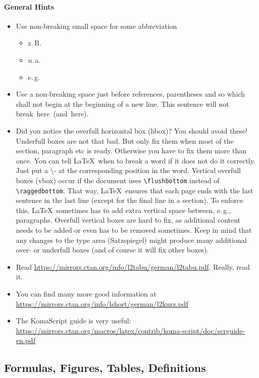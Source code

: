 \paragraph{General Hints}
\begin{itemize}
 \item Use non-breaking small space for some abbreviation
 \begin{itemize}
 \item z.\,B.
 \item u.\,a.
 \item e.\,g.
 \end{itemize}
 \item Use a non-breaking space just before references, parentheses and so which shall not begin at the beginning of a new line. This sentence will not break~here~(and~here).
 \item Did you notice the overfull horizontal box (hbox)? You should avoid these! Underfull boxes are not that bad. But only fix them when most of the section, paragraph etc is ready. Otherwise you have to fix them more than once. You can tell \LaTeX\ when to break a word if it does not do it correctly. Just put a \textbackslash- at the corresponding position in the word. Vertical overfull boxes (vbox) occur if the document uses \verb|\flushbottom| instead of \verb|\raggedbottom|. That way, \LaTeX\ ensures that each page ends with the last sentence in the last line (except for the final line in a section). To enforce this, \LaTeX\ sometimes has to add extra vertical space between, e.\,g., paragraphs. Overfull vertical boxes are hard to fix, as additional content needs to be added or even has to be removed sometimes. Keep in mind that any changes to the type area (Satzspiegel) might produce many additional over- or underfull boxes (and of course it will fix other boxes).
 \item Read \url{https://mirrors.ctan.org/info/l2tabu/german/l2tabu.pdf}. Really, read it.
 \item You can find many more good information at \url{https://mirrors.ctan.org/info/lshort/german/l2kurz.pdf}
 \item The KomaScript guide is very useful: \url{https://mirrors.ctan.org/macros/latex/contrib/koma-script/doc/scrguide-en.pdf}
\end{itemize}


\subsection{Formulas, Figures, Tables, Definitions}

